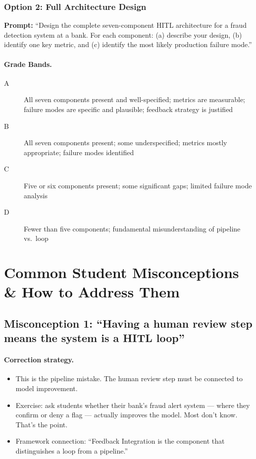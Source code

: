\subsubsection{Option 2: Full Architecture Design}

\textbf{Prompt:} ``Design the complete seven-component HITL architecture for a fraud detection system at a bank. For each component: (a) describe your design, (b) identify one key metric, and (c) identify the most likely production failure mode.''

\paragraph{Grade Bands.}
\begin{description}
    \item[A] All seven components present and well-specified; metrics are measurable; failure modes are specific and plausible; feedback strategy is justified
    \item[B] All seven components present; some underspecified; metrics mostly appropriate; failure modes identified
    \item[C] Five or six components present; some significant gaps; limited failure mode analysis
    \item[D] Fewer than five components; fundamental misunderstanding of pipeline vs.\ loop
\end{description}

\section{Common Student Misconceptions \& How to Address Them}

\subsection{Misconception 1: ``Having a human review step means the system is a HITL loop''}

\paragraph{Correction strategy.}
\begin{itemize}
    \item This is the pipeline mistake. The human review step must be connected to model improvement.
    \item Exercise: ask students whether their bank's fraud alert system --- where they confirm or deny a flag --- actually improves the model. Most don't know. That's the point.
    \item Framework connection: ``Feedback Integration is the component that distinguishes a loop from a pipeline.''
\end{itemize}

